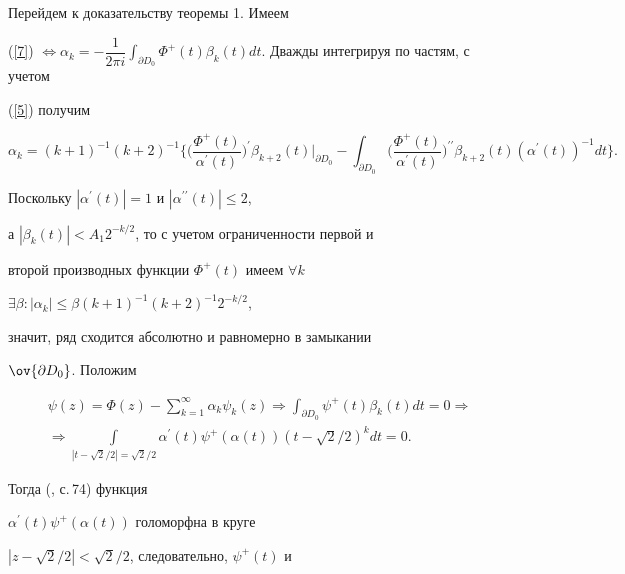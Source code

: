 Перейдем к доказательству теоремы 1. Имеем


(\ref{7}) $\Longleftrightarrow


\alpha_k=-\dfrac{1}{2\pi i}\displaystyle\int_{\partial


D_0}\Phi^+(t)\beta_k(t) dt$. Дважды интегрируя по частям, с учетом


(\ref{5}) получим


$$


\alpha_k=(k+1)^{-1}(k+2)^{-1}


\bigg\{\bigg(\frac{\Phi^+(t)}{\alpha^\prime(t)}\bigg)^\prime


\beta_{k+2}(t)\Big|_{\partial D_0}-


\int_{\partial D_0}


\bigg(\frac{\Phi^+(t)}{\alpha^\prime(t)}\bigg)^{\prime\prime}


\beta_{k+2}(t)(\alpha^\prime(t))^{-1}dt\bigg\}.


$$


Поскольку $|\alpha^\prime(t)|=1$ и $|\alpha^{\prime\prime}(t)|\le 2$,


а $|\beta_k(t)|<A_1 2^{-k/2}$, то с учетом ограниченности первой и


второй производных функции $\Phi^+(t)$ имеем $\forall k$


$\exists\beta: |\alpha_k|\le\beta(k+1)^{-1}(k+2)^{-1}2^{-k/2}$,


значит, ряд сходится абсолютно и равномерно в замыкании


$\ov{\partial D_0}$. Положим


\begin{multline*}


\psi(z)=\Phi(z)-\sum_{k=1}^\infty\alpha_k\psi_k(z) \Longrightarrow


\int_{\partial D_0}\psi^+(t)\beta_k(t)dt=0 \Longrightarrow \\


%


\Longrightarrow


\int\limits_{|t-\sqrt2/2|=\sqrt2/2} \alpha^\prime(t)


\psi^+(\alpha(t))(t-\sqrt2/2)^kdt=0.


\end{multline*}


Тогда (\cite{Shab}, с.\,74) функция


$\alpha^\prime(t)\psi^+(\alpha(t))$ голоморфна в круге


$|z-\sqrt2/2|<\sqrt2/2$, следовательно, $\psi^+(t)$ и


